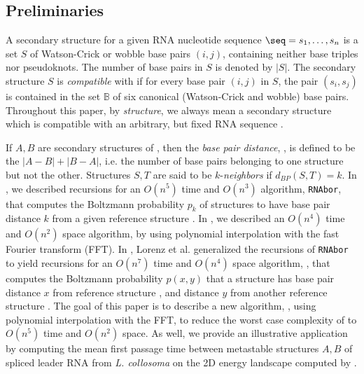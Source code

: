 \subsection{Preliminaries}


A secondary structure for a given RNA nucleotide sequence
$\seq = s_1,\dots,s_n$ is a set $S$ of Watson-Crick or wobble
base pairs $(i,j)$, containing neither base triples nor pseudoknots.
The number of base pairs in $S$ is denoted by $|S|$.
The secondary structure $S$ is {\em compatible}
with \seq if for every base pair $(i,j)$ in $S$, the pair
$(s_i,s_j)$ is contained in the set
$\mathbb{B}$
of six canonical (Watson-Crick and wobble) base pairs.
Throughout this paper, by {\em structure}, we always mean a
secondary structure which is compatible with an arbitrary, but fixed
RNA sequence \seq.

If $A,B$ are secondary structures of \seq, then the {\em base pair distance},
\dBP{\strA}{\strB}, is defined to be the $|A-B|+|B-A|$, i.e. the number of
base pairs belonging to one structure but not the other.
Structures $S,T$ are said to be $k$-{\em neighbors} if $d_{BP}(S,T) = k$.
In \cite{Freyhult.b07}, we described recursions for an $O(n^5)$ time and
$O(n^3)$ algorithm, {\tt RNAbor}, that computes the Boltzmann probability
$p_k$ of structures to have base pair distance $k$ from a given reference
structure \strA. In \cite{fftbor}, we described an $O(n^4)$ time and
$O(n^2)$ space algorithm, by using polynomial interpolation with the
fast Fourier transform (FFT).
In \cite{hofacker:RNAbor2D}, Lorenz et al. generalized
the recursions  of {\tt RNAbor} \cite{Freyhult.b07}
to yield recursions for an $O(n^7)$ time and $O(n^4)$ space
algorithm, \rnatwofold,
that computes the Boltzmann probability $p(x,y)$ that a structure has
base pair distance $x$ from reference structure \strA, and distance
$y$ from another reference structure \strB.
The goal of this paper is to describe a new algorithm, \ffttwo,
using polynomial interpolation with the FFT, to
reduce the worst case complexity of \rnatwofold to
$O(n^5)$ time and $O(n^2)$ space. As well, we provide an
illustrative application by computing the mean first passage time
between metastable structures $A,B$ of spliced leader RNA from
{\em L. collosoma} on the 2D energy landscape computed by \ffttwo.

